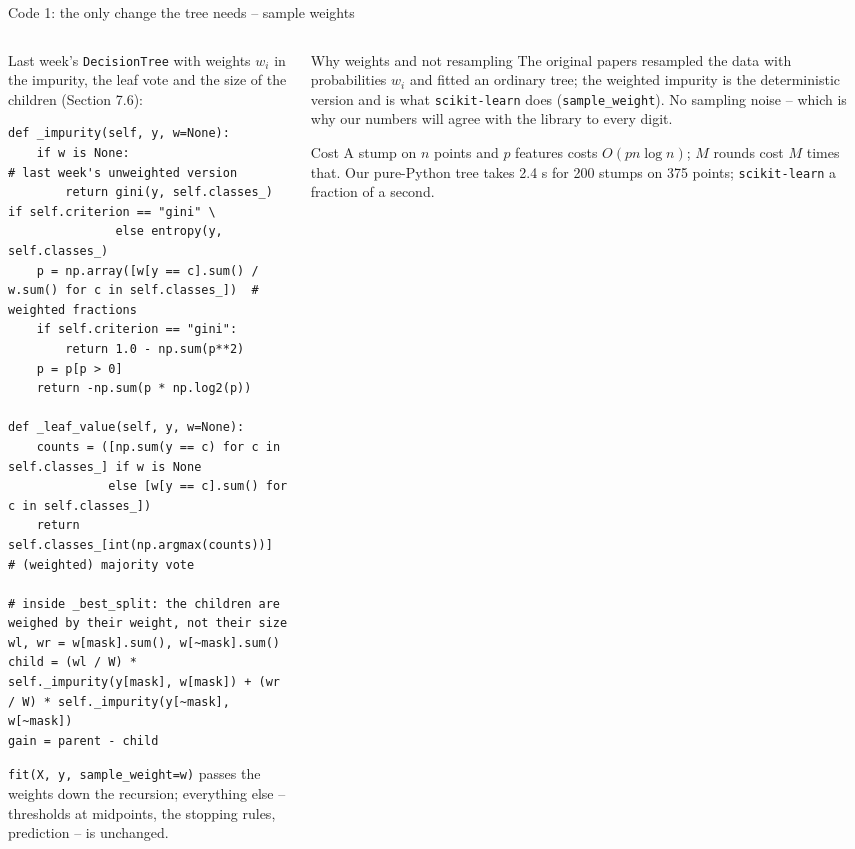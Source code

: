 \documentclass[10pt,aspectratio=169]{beamer}
\begin{document}
\begin{frame}[fragile]{Code 1: the only change the tree needs -- sample weights}
\begin{columns}[T]
\begin{column}{0.6\textwidth}
\footnotesize
Last week's \texttt{DecisionTree} with weights $w_i$ in the impurity, the
leaf vote and the size of the children (Section 7.6):
\begin{lstlisting}[basicstyle=\ttfamily\tiny]
def _impurity(self, y, w=None):
    if w is None:                       # last week's unweighted version
        return gini(y, self.classes_) if self.criterion == "gini" \
               else entropy(y, self.classes_)
    p = np.array([w[y == c].sum() / w.sum() for c in self.classes_])  # weighted fractions
    if self.criterion == "gini":
        return 1.0 - np.sum(p**2)
    p = p[p > 0]
    return -np.sum(p * np.log2(p))

def _leaf_value(self, y, w=None):
    counts = ([np.sum(y == c) for c in self.classes_] if w is None
              else [w[y == c].sum() for c in self.classes_])
    return self.classes_[int(np.argmax(counts))]        # (weighted) majority vote

# inside _best_split: the children are weighed by their weight, not their size
wl, wr = w[mask].sum(), w[~mask].sum()
child = (wl / W) * self._impurity(y[mask], w[mask]) + (wr / W) * self._impurity(y[~mask], w[~mask])
gain = parent - child
\end{lstlisting}
\texttt{fit(X, y, sample\_weight=w)} passes the weights down the recursion;
everything else -- thresholds at midpoints, the stopping rules, prediction
-- is unchanged.
\end{column}
\begin{column}{0.4\textwidth}
\begin{block}{Why weights and not resampling}
\footnotesize
The original papers resampled the data with probabilities $w_i$ and fitted
an ordinary tree; the weighted impurity is the deterministic version and is
what \texttt{scikit-learn} does (\texttt{sample\_weight}).  No sampling
noise -- which is why our numbers will agree with the library to every
digit.
\end{block}
\begin{block}{Cost}
\footnotesize
A stump on $n$ points and $p$ features costs $O(pn\log n)$; $M$ rounds
cost $M$ times that.  Our pure-Python tree takes 2.4 s for 200 stumps on
375 points; \texttt{scikit-learn} a fraction of a second.
\end{block}
\end{column}
\end{columns}
\end{frame}
\end{document}
